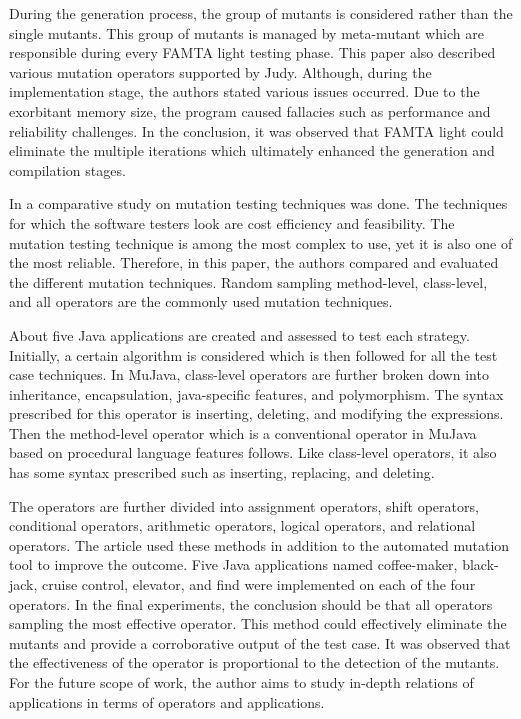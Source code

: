 During the generation process, the group of mutants is considered rather than the single mutants. This group of mutants is managed by meta-mutant which are responsible during every FAMTA light testing phase. This paper also described various mutation operators supported by Judy. Although, during the implementation stage, the authors stated various issues occurred. Due to the exorbitant memory size, the program caused fallacies such as performance and reliability challenges. In the conclusion, it was observed that FAMTA light could eliminate the multiple iterations which ultimately enhanced the generation and compilation stages.\par 
In \cite{ref24} a comparative study on mutation testing techniques was done. The techniques for which the software testers look are cost efficiency and feasibility. The mutation testing technique is among the most complex to use, yet it is also one of the most reliable. Therefore, in this paper, the authors compared and evaluated the different mutation techniques. Random sampling method-level, class-level, and all operators are the commonly used mutation techniques.\par 
About five Java applications are created and assessed to test each strategy. Initially, a certain algorithm is considered which is then followed for all the test case techniques. In MuJava, class-level operators are further broken down into inheritance, encapsulation, java-specific features, and polymorphism. The syntax prescribed for this operator is inserting, deleting, and modifying the expressions. Then the method-level operator which is a conventional operator in MuJava based on procedural language features follows. Like class-level operators, it also has some syntax prescribed such as inserting, replacing, and deleting.\par 
The operators are further divided into assignment operators, shift operators, conditional operators, arithmetic operators, logical operators, and relational operators. The article used these methods in addition to the automated mutation tool to improve the outcome. Five Java applications named coffee-maker, black-jack, cruise control, elevator, and find were implemented on each of the four operators. In the final experiments, the conclusion should be that all operators sampling the most effective operator. This method could effectively eliminate the mutants and provide a corroborative output of the test case. It was observed that the effectiveness of the operator is proportional to the detection of the mutants. For the future scope of work, the author aims to study in-depth relations of applications in terms of operators and applications. \par 
